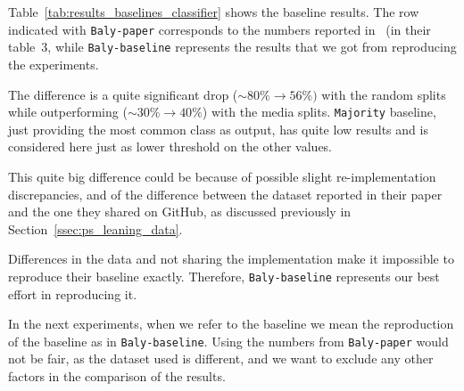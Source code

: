 Table~\ref{tab:results_baselines_classifier} shows the baseline results.
The row indicated with \texttt{Baly-paper} corresponds to the numbers reported in~\citet{baly2020we} (in their table~3, while \texttt{Baly-baseline} represents the results that we got from reproducing the experiments.

The difference is a quite significant drop ($\sim80\% \rightarrow 56\%)$ with the random splits while outperforming ($\sim30\% \rightarrow 40\%$) with the media splits.
\texttt{Majority} baseline, just providing the most common class as output, has quite low results and is considered here just as lower threshold on the other values.


This quite big difference could be because of possible slight re-implementation discrepancies, and of the difference between the dataset reported in their paper and the one they shared on GitHub, as discussed previously in Section~\ref{ssec:ps_leaning_data}.%

Differences in the data and not sharing the implementation make it impossible to reproduce their baseline exactly.
Therefore, \texttt{Baly-baseline} represents our best effort in reproducing it.

In the next experiments, when we refer to the baseline
we mean the reproduction of the baseline as in \texttt{Baly-baseline}. Using the numbers from \texttt{Baly-paper} would not be fair, as the dataset used is different, and we want to exclude any other factors in the comparison of the results.






